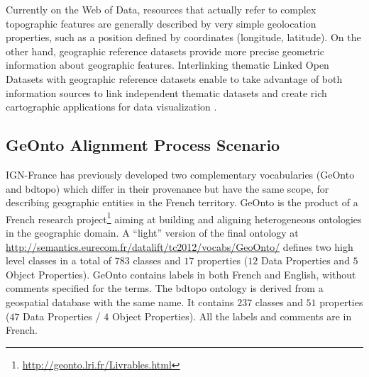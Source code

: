 Currently on the Web of Data, resources that actually refer to complex topographic features are generally described by very simple geolocation properties, such as a position defined by coordinates (longitude, latitude). On the other hand, geographic reference datasets provide more precise geometric information about geographic features. Interlinking thematic Linked Open Datasets with geographic reference datasets enable to take advantage of both information sources to link independent thematic datasets and create rich cartographic applications for data visualization \cite{feliachi2013}.



\subsection{GeOnto Alignment Process Scenario}
 \label{sec:vocabalignment}
IGN-France has previously developed two complementary vocabularies (GeOnto and bdtopo) which differ in their provenance but have the same scope, for describing geographic entities in the French territory. GeOnto is the product of a French research project\footnote{\url{http://geonto.lri.fr/Livrables.html}} aiming at building and aligning heterogeneous ontologies in the geographic domain. A ``light'' version of the final ontology at \url{http://semantics.eurecom.fr/datalift/tc2012/vocabs/GeoOnto/} defines two high level classes in a total of $783$ classes and $17$ properties ($12$ Data Properties and $5$ Object Properties). GeOnto contains labels in both French and English, without comments specified for the terms. The bdtopo ontology is derived from a geospatial database with the same name. It contains $237$ classes and $51$ properties ($47$ Data Properties / $4$ Object Properties). All the labels and comments are in French.


